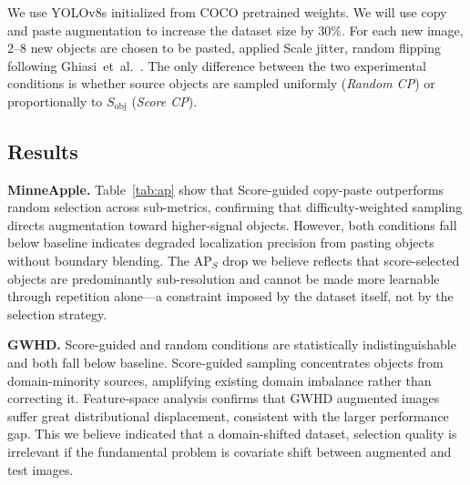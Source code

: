 \documentclass[conference]{IEEEtran}
\begin{document}
We use YOLOv8s initialized from COCO pretrained weights.
We will use copy and paste augmentation to increase the dataset size by 30\%.
For each new image, 2--8 new objects are chosen to be pasted, applied
Scale jitter, random flipping following
Ghiasi~et~al.~\cite{ghiasi2021simple}.
The only difference between the two experimental conditions is
whether source objects are sampled uniformly (\textit{Random CP})
or proportionally to $S_{\mathrm{obj}}$ (\textit{Score CP}).

\subsection{Results}

\noindent\textbf{MinneApple.} Table~\ref{tab:ap} show that Score-guided 
copy-paste outperforms random selection across 
sub-metrics, confirming that
difficulty-weighted sampling directs augmentation toward
higher-signal objects.
However, both conditions fall below baseline indicates degraded
localization precision from pasting  objects without boundary
blending.  The AP$_S$ drop we believe reflects that score-selected
objects are predominantly sub-resolution and cannot be made more
learnable through repetition alone---a constraint imposed by the
dataset itself, not by the selection strategy.


\noindent\textbf{GWHD.}
Score-guided and random conditions are statistically
indistinguishable and both fall below baseline.
Score-guided sampling concentrates objects from domain-minority
sources, amplifying existing domain imbalance
rather than correcting it.
Feature-space analysis confirms that GWHD augmented images suffer
great distributional displacement, consistent with
the larger performance gap.
This we believe indicated that a domain-shifted dataset, 
selection quality is irrelevant if
the fundamental problem is covariate shift between augmented and
test images.
\end{document}
